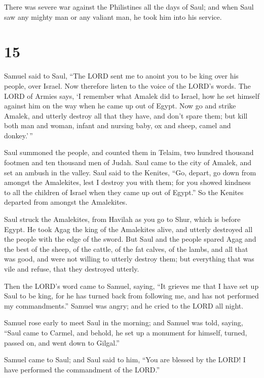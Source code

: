  There was severe war against the Philistines all the days
of Saul; and when Saul saw any mighty man or any valiant man, he took
him into his service.

\hypertarget{section-14}{%
\section{15}\label{section-14}}

 Samuel said to Saul, ``The LORD sent me to anoint you to be
king over his people, over Israel. Now therefore listen to the voice of
the LORD's words.  The LORD of Armies says, `I remember what
Amalek did to Israel, how he set himself against him on the way when he
came up out of Egypt.  Now go and strike Amalek, and utterly
destroy all that they have, and don't spare them; but kill both man and
woman, infant and nursing baby, ox and sheep, camel and donkey.'\,''

 Saul summoned the people, and counted them in Telaim, two
hundred thousand footmen and ten thousand men of Judah. 
Saul came to the city of Amalek, and set an ambush in the valley.
 Saul said to the Kenites, ``Go, depart, go down from
amongst the Amalekites, lest I destroy you with them; for you showed
kindness to all the children of Israel when they came up out of Egypt.''
So the Kenites departed from amongst the Amalekites.

 Saul struck the Amalekites, from Havilah as you go to Shur,
which is before Egypt.  He took Agag the king of the
Amalekites alive, and utterly destroyed all the people with the edge of
the sword.  But Saul and the people spared Agag and the best
of the sheep, of the cattle, of the fat calves, of the lambs, and all
that was good, and were not willing to utterly destroy them; but
everything that was vile and refuse, that they destroyed utterly.

 Then the LORD's word came to Samuel, saying, 
``It grieves me that I have set up Saul to be king, for he has turned
back from following me, and has not performed my commandments.'' Samuel
was angry; and he cried to the LORD all night.

 Samuel rose early to meet Saul in the morning; and Samuel
was told, saying, ``Saul came to Carmel, and behold, he set up a
monument for himself, turned, passed on, and went down to Gilgal.''

 Samuel came to Saul; and Saul said to him, ``You are
blessed by the LORD! I have performed the commandment of the LORD.''

